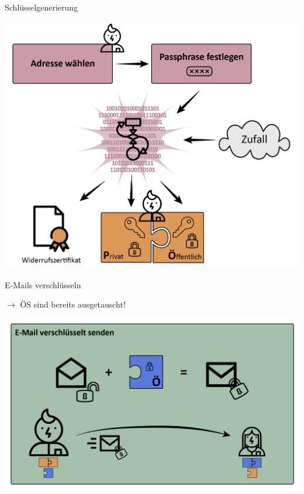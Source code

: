 \documentclass{beamer}
\begin{document}
\begin{frame}[label=lk1]{Schlüsselgenerierung}
  \begin{center}
  \includegraphics[width=.8\textwidth]{img-src/pgp_keygen.png}
  \end{center}
\end{frame}


\begin{frame}[label=lk1]{E-Mails verschlüsseln}
  
  $\rightarrow$ ÖS sind bereits ausgetauscht!
  \begin{center}
  \includegraphics[width=.9\textwidth]{img-src/pgp_enc.png}
  \end{center}
\end{frame}

\end{document}
